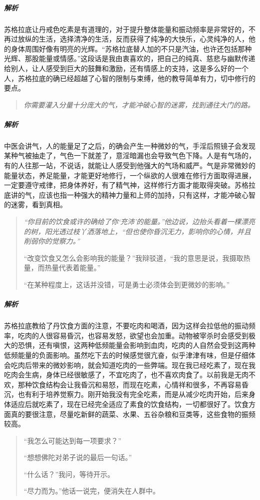 \subparagraph{解析} 苏格拉底让丹戒色吃素是有道理的，对于提升整体能量和振动频率是非常好的，不再过放纵的生活，选择清净的生活，反而获得了纯净的大快乐，心灵纯净的人，他的身体周围好像有明亮的光辉。“苏格拉底替人加的不只是汽油，也许还包括那种光辉、那股能量或情感。”这段话是我由衷喜欢的，把自己的纯真、慈悲与幽默传递给别人，让人感受到巨大的鼓舞和激励，还有情感上的支持，这是多么好的一个人，苏格拉底的确已经超越了心智的限制与束缚，他的教导简单有力，切中修行的要点。

\begin{quote}\it
    你需要灌入分量十分庞大的气，才能冲破心智的迷雾，找到通往大门的路。
\end{quote}

\subparagraph{解析} 中医会讲气，人的能量足了之后，的确会产生一种微妙的气，手淫后照镜子会发现某种气被抽走了，气色一下就差了，意淫暗漏也会导致气色下降。人是有气场的，有的人往那一站，不说话，就能让人感受到他强大的气场和威严。气是非常微妙的能量状态，养足能量，才能更好地修行，一个纵欲的人很难在修行方面取得进展，一定要遵守戒律，把身体养好，有了精气神，这样修行方面才能取得突破。苏格拉底讲的气，应该也指一种强大的精神力量和上师的加持，只有这样，才能冲破心智的迷雾，看到真相。

\begin{quotation}\it
    “你目前的饮食或许的确给了你‘充沛’的能量。”他边说，边抬头看着一棵漂亮的树，阳光透过枝丫洒落地上，“但也使你昏沉无力，影响你的心情，并且削弱你的觉察力。”

    “改变饮食又怎么会影响我的能量？”我辩驳道，“我的意思是说，我摄取热量，而热量代表着能量。”

    “在某种程度上，这话并没错，可是勇士必须体会到更微妙的影响。”
\end{quotation}

\subparagraph{解析} 苏格拉底教给了丹饮食方面的注意，不要吃肉和喝酒，因为这样会拉低他的振动频率，吃肉的人很容易昏沉，也容易发怒，欲望也会加重。动物被宰杀时会感受到极大的恐惧，还有嗔恨，这两种低频能量会影响到血肉，吃肉的人自然会受到这两种低频能量的负面影响。虽然吃下去的时候感觉很亢奋，似乎津津有味，但是仔细体会吃肉后带来的微妙影响，就会知道吃肉的一些弊端。现在我已经吃素了，现在我吃肉会生病，身体已经很敏感了，不宜吃肉了，也不喜欢肉食了。以前我是无肉不欢，那种饮食结构会让我昏沉和易怒，而现在吃素，心情祥和很多，不再容易昏沉，也有利于培养觉察力。刚开始我没有完全吃素，而是从减少吃肉开始，后来身体适应后就吃素了，现在已经完全适应了素食的饮食结构，一切都很好了。饮食方面真的要很注意，尽量吃新鲜的蔬菜、水果、五谷杂粮和豆类等，这些食物的振频较高。

\begin{quotation}
    “我怎么可能达到每一项要求？”

    “想想佛陀对弟子说的最后一句话。”

    “什么话？”我问，等待开示。

    “尽力而为。”他话一说完，便消失在人群中。
\end{quotation}

